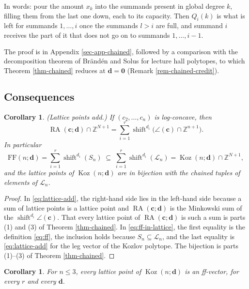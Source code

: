 \documentclass[11pt, a4paper, abstract=yes]{scrartcl}
\theoremstyle{definition}
\theoremstyle{remark}
\theoremstyle{plain}
\newtheorem{corollary}[definition]{Corollary}
\newcommand{\vek}[1]{\boldsymbol{#1}}
\theoremstyle{remark}
\theoremstyle{plain}
\newcommand{\Koz}{\operatorname{Koz}}
\newcommand{\shift}{\operatorname{shift}}
\newcommand{\rasimp}{\angle}
\newcommand{\RA}{\operatorname{RA}}
\newcommand{\FF}{\mathrm{FF}}
\newcommand{\leandiscof}[1]{\tikz[baseline=-0.6ex]\fill[#1] (0,0) circle (0.6ex);}
\newcommand{\leanfull}{\leandiscof{leanfull}}
\newcommand{\leanmark}[1]{\leavevmode{\reversemarginpar\marginnote{\raggedleft#1}}}
\begin{document}
In words: pour the amount \(x_k\) into the summands present in global degree \(k\), filling them
from the last one down, each to its capacity. Then \(Q_i(k)\) is what is left for summands
\(1,\dots,i\) once the summands \(l>i\) are full, and summand \(i\) receives the part of it that
does not go on to summands \(1,\dots,i-1\).

The proof is in Appendix \ref{sec-app-chained}, followed by a comparison with the decomposition
theorem of Brändén and Solus for lecture hall polytopes, to which Theorem \ref{thm-chained} reduces at
\(\vek d=\vek 0\) (Remark \ref{rem-chained-credit}).
\subsection{Consequences}
\label{sec:org8a44cf5}

\begin{corollary}
\leanmark{\leanfull}(\emph{Lattice points add.}) If \((c_2,\dots,c_n)\) is log-concave, then
\begin{equation}\label{eq:lattice-add}
  \RA(\vek c;\vek d)\cap\mathbb Z^{N+1}=\sum_{i=1}^r\shift^{d_i}\bigl(\rasimp(\vek c)\cap\mathbb Z^{n+1}\bigr).
\end{equation}
In particular
\begin{equation}\label{eq:ff-in-lattice}
  \FF(n;\vek d)=\sum_{i=1}^r\shift^{d_i}(S_n)\;\subseteq\;\sum_{i=1}^r\shift^{d_i}(\mathcal L_n)=\Koz(n;\vek d)\cap\mathbb Z^{N+1},
\end{equation}
and the lattice points of \(\Koz(n;\vek d)\) are in bijection with the chained tuples of
elements of \(\mathcal L_n\).
\label{cor-additivity}
\end{corollary}

\begin{proof}
In \eqref{eq:lattice-add}, the right-hand side lies in the left-hand side because a sum of lattice
points is a lattice point and \(\RA(\vek c;\vek d)\) is the Minkowski sum of the
\(\shift^{d_i}\rasimp(\vek c)\). That every lattice point of \(\RA(\vek c;\vek d)\) is such a sum is
parts (1) and (3) of Theorem \ref{thm-chained}. In \eqref{eq:ff-in-lattice}, the first equality is the
definition \eqref{eq:ff}, the inclusion holds because \(S_n\subseteq\mathcal L_n\), and the last
equality is \eqref{eq:lattice-add} for the leg vector of the Kozlov polytope. The bijection is
parts (1)--(3) of Theorem \ref{thm-chained}.
\end{proof}

\begin{corollary}
\leanmark{\leanfull}For \(n\le3\), every lattice point of \(\Koz(n;\vek d)\) is an ff-vector, for every \(r\) and every
\(\vek d\).
\label{cor-small-n}
\end{corollary}
\end{document}
